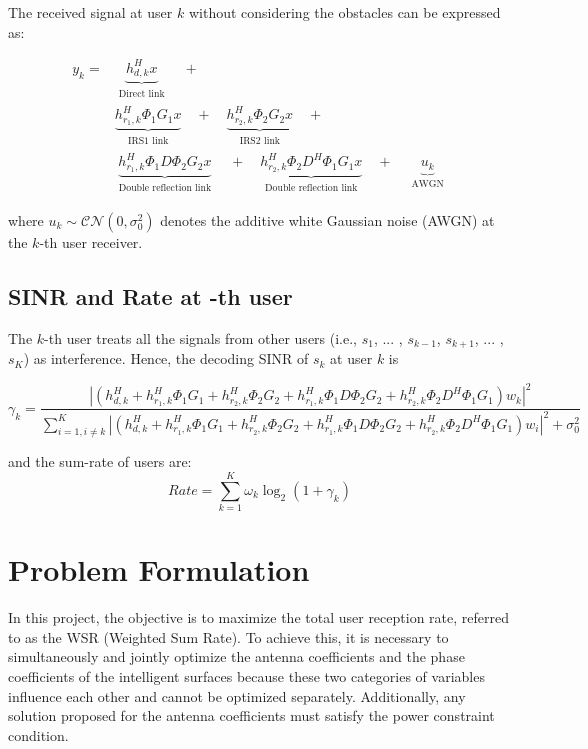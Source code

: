 \documentclass{article}
\begin{document}
The received signal at user $k$ without considering the obstacles can be expressed as:

\begin{align*}
	y_k = &\underbrace{h_{d,k}^H x}_
	{\substack{\text{Direct link}}}
	\quad + \quad \\
	&\underbrace{h_{r_1,k}^H \Phi_1 G_1 x}_
	{\substack{\text{IRS1 link}}}
	\quad + \quad
	\underbrace{h_{r_2,k}^H \Phi_2 G_2 x}_
	{\substack{\text{IRS2 link}}}
	\quad + \quad \\ 
	&\underbrace{h_{r_1,k}^H \Phi_1 D \Phi_2 G_2 x}_
	{\substack{\text{Double reflection link}}}
	\quad + \quad
	\underbrace{h_{r_2,k}^H \Phi_2 D^H \Phi_1 G_1 x}_
	{\substack{\text{Double reflection link}}} \quad + \quad
	\underbrace{u_k}_
	{\substack{\text{AWGN}}}
\end{align*}

where $u_k \sim \mathcal{CN}(0, \sigma_0^2)$ denotes the additive white Gaussian noise (AWGN) at the $k$-th user receiver.

\subsection{SINR and Rate at -th user}
The $k$-th user treats all the signals from other users (i.e.,
$s_1$, ... , $s_{k-1}$, $s_{k+1}$, ... , $s_K$) as interference. Hence, the decoding SINR of $s_k$ at user $k$ is

\[
\gamma_k = \frac{{\left|\left(h_{d,k}^H + h_{r_1,k}^H \Phi_1 G_1 + h_{r_2,k}^H \Phi_2 G_2 + h_{r_1,k}^H \Phi_1 D \Phi_2 G_2 + h_{r_2,k}^H \Phi_2 D^H \Phi_1 G_1 \right)w_k\right|^2}}{{\sum_{i=1,i\neq k}^{K} \left|\left(h_{d,k}^H + h_{r_1,k}^H \Phi_1 G_1 + h_{r_2,k}^H \Phi_2 G_2 + h_{r_1,k}^H \Phi_1 D \Phi_2 G_2 + h_{r_2,k}^H \Phi_2 D^H \Phi_1 G_1 \right)w_i\right|^2 + \sigma^2_0}}
\]

and the sum-rate of users are:
\[Rate = \sum_{k=1}^{K} \omega_k \log_2(1 + \gamma_k)\]

\section{Problem Formulation}
In this project, the objective is to maximize the total user reception rate, referred to as the WSR (Weighted Sum Rate). To achieve this, it is necessary to simultaneously and jointly optimize the antenna coefficients and the phase coefficients of the intelligent surfaces because these two categories of variables influence each other and cannot be optimized separately. Additionally, any solution proposed for the antenna coefficients must satisfy the power constraint condition.
\end{document}
